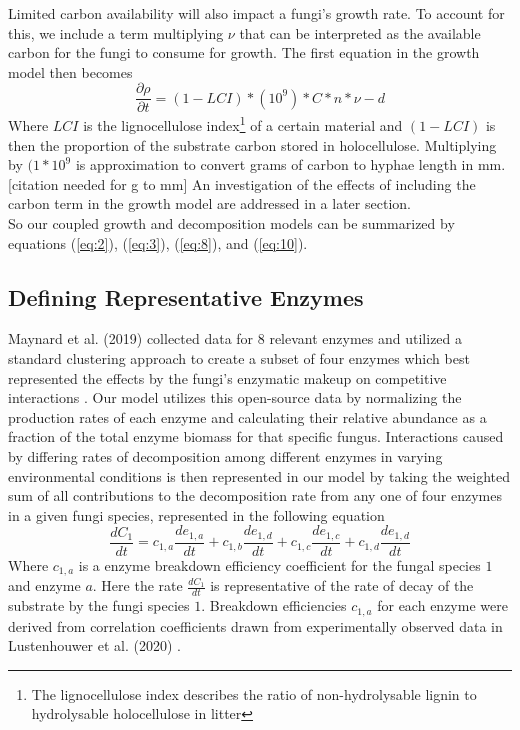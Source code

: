 \documentclass[12pt]{article}
\begin{document}
\begin{multicols}{2}
Limited carbon availability will also impact a fungi's growth rate. To account for this, we include a term multiplying $\nu$ that can be interpreted as the available carbon for the fungi to consume for growth. The first equation in the growth model then becomes
\begin{equation} \label{eq:10}
\frac{\partial \rho}{\partial t} = (1-LCI)*(10^{9})*C*n*\nu - d
\end{equation}
Where $LCI$ is the lignocellulose index\footnote{The lignocellulose index describes the ratio of non-hydrolysable lignin to hydrolysable holocellulose in litter} of a certain material and $(1-LCI)$ is then the proportion of the substrate carbon stored in holocellulose. Multiplying by $(1*10^{9}$ is approximation to convert grams of carbon to hyphae length in mm. [citation needed for g to mm] An investigation of the effects of including the carbon term in the growth model are addressed in a later section. \\

So our coupled growth and decomposition models can be summarized by equations (\ref{eq:2}), (\ref{eq:3}), (\ref{eq:8}), and (\ref{eq:10}).

\subsection{Defining Representative Enzymes}

Maynard et al. (2019) collected data for 8 relevant enzymes and utilized a standard clustering approach to create a subset of four enzymes which best represented the effects by the fungi's enzymatic makeup on competitive interactions \cite{Maynard2019}. Our model utilizes this open-source data by normalizing the production rates of each enzyme and calculating their relative abundance as a fraction of the total enzyme biomass for that specific fungus. Interactions caused by differing rates of decomposition among different enzymes in varying environmental conditions is then represented in our model by taking the weighted sum of all contributions to the decomposition rate from any one of four enzymes in a given fungi species, represented in the following equation
\begin{equation} \label{eq}
\frac{dC_{1}}{dt} = c_{1,a}\frac{de_{1,a}}{dt} + c_{1,b}\frac{de_{1,d}}{dt} + c_{1,c}\frac{de_{1,c}}{dt} + c_{1,d}\frac{de_{1,d}}{dt}
\end{equation}
Where $c_{1,a}$ is a enzyme breakdown efficiency coefficient for the fungal species $1$ and enzyme $a$. Here the rate $\frac{dC_{1}}{dt}$ is representative of the rate of decay of the substrate by the fungi species $1$. Breakdown efficiencies $c_{1,a}$ for each enzyme were derived from correlation coefficients drawn from experimentally observed data in Lustenhouwer et al. (2020) \cite{Lustenhouwer2020}. 


\end{multicols}
\end{document}
